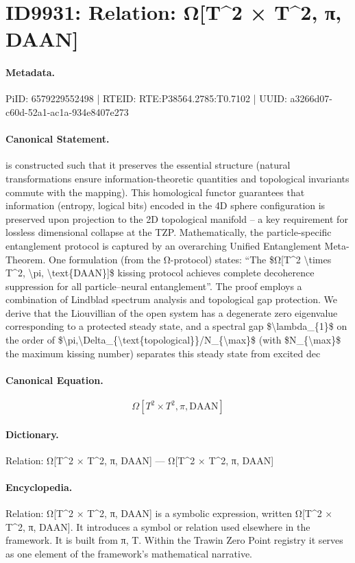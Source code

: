 \section*{ID9931: Relation: Ω[T\textasciicircum{}2 × T\textasciicircum{}2, π, DAAN]}
\paragraph{Metadata.}
PiID: 6579229552498 | RTEID: RTE:P38564.2785:T0.7102 | UUID: a3266d07-c60d-52a1-ac1a-934e8407e273

\paragraph{Canonical Statement.}
is constructed such that it preserves the essential structure (natural transformations ensure information-theoretic quantities and topological invariants commute with the mapping). This homological functor guarantees that information (entropy, logical bits) encoded in the 4D sphere configuration is preserved upon projection to the 2D topological manifold – a key requirement for lossless dimensional collapse at the TZP. Mathematically, the particle-specific entanglement protocol is captured by an overarching Unified Entanglement Meta-Theorem. One formulation (from the Ω-protocol) states: “The \$Ω[T\textasciicircum{}2 \textbackslash{}times T\textasciicircum{}2, \textbackslash{}pi, \textbackslash{}text\{DAAN\}]\$ kissing protocol achieves complete decoherence suppression for all particle–neural entanglement”. The proof employs a combination of Lindblad spectrum analysis and topological gap protection. We derive that the Liouvillian of the open system has a degenerate zero eigenvalue corresponding to a protected steady state, and a spectral gap \$\textbackslash{}lambda\_\{1\}\$ on the order of \$\textbackslash{}pi,\textbackslash{}Delta\_\{\textbackslash{}text\{topological\}\}/N\_\{\textbackslash{}max\}\$ (with \$N\_\{\textbackslash{}max\}\$ the maximum kissing number) separates this steady state from excited dec

\paragraph{Canonical Equation.}
\[
Ω[T^2 \times T^2, \pi, \text{DAAN}]
\]

\paragraph{Dictionary.}
Relation: Ω[T\textasciicircum{}2 × T\textasciicircum{}2, π, DAAN] — Ω[T\textasciicircum{}2 × T\textasciicircum{}2, π, DAAN]

\paragraph{Encyclopedia.}
Relation: Ω[T\textasciicircum{}2 × T\textasciicircum{}2, π, DAAN] is a symbolic expression, written Ω[T\textasciicircum{}2 × T\textasciicircum{}2, π, DAAN]. It introduces a symbol or relation used elsewhere in the framework. It is built from π, T. Within the Trawin Zero Point registry it serves as one element of the framework's mathematical narrative.
